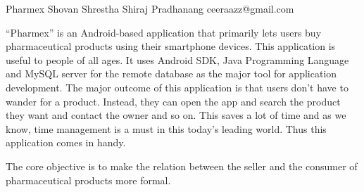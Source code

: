  \begin{conf-abstract}[]
 {Pharmex}
 {Shovan Shrestha
 	 Shiraj Pradhanang
 }
{ceeraazz@gmail.com}

“Pharmex” is an Android-based application that primarily lets users buy pharmaceutical products using their smartphone devices. This application is useful to people of all ages. It uses Android SDK, Java Programming Language and MySQL server for the remote database as the major tool for application development. The major outcome of this application is that users don’t have to wander for a product. Instead, they can open the app and search the product they want and contact the owner and so on. This saves a lot of time and as we know, time management is a must in this today’s leading world. Thus this application comes in handy.

The core objective is to make the relation between the seller and the consumer of pharmaceutical products more formal.
 \end{conf-abstract}
